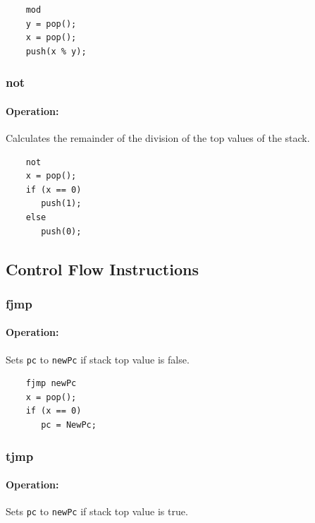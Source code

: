	\begin{lstlisting}
	mod
	y = pop();
	x = pop();
	push(x % y);
	\end{lstlisting}

\subsubsection{not}

\paragraph{Operation:}
Calculates the remainder of the division of the top values of the stack.

	\begin{lstlisting}
	not
	x = pop();
	if (x == 0)
	   push(1);
	else
	   push(0);
	\end{lstlisting}

\subsection{Control Flow Instructions}

\subsubsection{fjmp}

\paragraph{Operation:}
Sets \lstinline$pc$ to \lstinline$newPc$ if stack top value is false.

	\begin{lstlisting}
	fjmp newPc
	x = pop();
	if (x == 0)
	   pc = NewPc;
	\end{lstlisting}

\subsubsection{tjmp}

\paragraph{Operation:}
Sets \lstinline$pc$ to \lstinline$newPc$ if stack top value is true.

